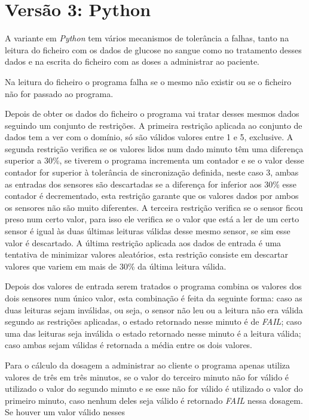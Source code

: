 \section{Versão 3: Python}
\label{sec:versao3_python}
A variante em \textit{Python} tem vários mecanismos de tolerância a falhas, tanto na leitura do ficheiro com os dados
de glucose no sangue como no tratamento desses dados e na escrita do ficheiro com as doses a administrar ao paciente.\par
Na leitura do ficheiro o programa falha se o mesmo não existir ou se o ficheiro não for passado ao programa.\par
Depois de obter os dados do ficheiro o programa vai tratar desses mesmos dados seguindo um conjunto de restrições.
A primeira restrição aplicada ao conjunto de dados tem a ver com o domínio, só são válidos valores entre 1 e 5, exclusive.
A segunda restrição verifica se os valores lidos num dado minuto têm uma diferença superior a 30\%, se tiverem o programa
incrementa um contador e se o valor desse contador for superior à tolerância de sincronização definida, neste caso 3,
ambas as entradas dos sensores são descartadas se a diferença for inferior aos 30\% esse contador é decrementado, esta
restrição garante que os valores dados por ambos os sensores não são muito diferentes.
A terceira restrição verifica se o sensor ficou preso num certo valor, para isso ele verifica se o valor que está a ler
de um certo sensor é igual às duas últimas leituras válidas desse mesmo sensor, se sim esse valor é descartado.
A última restrição aplicada aos dados de entrada é uma tentativa de minimizar valores aleatórios, esta restrição
consiste em descartar valores que variem em mais de 30\% da última leitura válida.\par
Depois dos valores de entrada serem tratados o programa combina os valores dos dois sensores num único valor, esta
combinação é feita da seguinte forma: caso as duas leituras sejam inválidas, ou seja, o sensor não leu ou a leitura não
era válida segundo as restrições aplicadas, o estado retornado nesse minuto é de \textit{FAIL}; caso uma das leituras seja
inválida o estado retornado nesse minuto é a leitura válida; caso ambas sejam válidas é retornada a média entre os dois
valores.\par
Para o cálculo da dosagem a administrar ao cliente o programa apenas utiliza valores de três em três minutos, se o valor
do terceiro minuto não for válido é utilizado o valor do segundo minuto e se esse não for válido é utilizado o valor do
primeiro minuto, caso nenhum deles seja válido é retornado \textit{FAIL} nessa dosagem. Se houver um valor válido nesses
